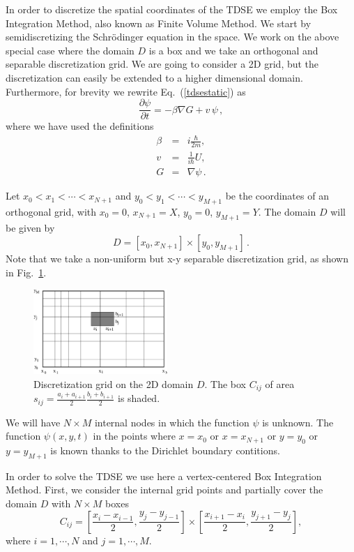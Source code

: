 \documentclass[a4paper,11pt]{article}
\begin{document}
In order to discretize the spatial coordinates of the TDSE we employ
the Box Integration Method, also known as Finite Volume Method.
We start by semidiscretizing the Schr\"{o}dinger equation in the space.
We work on the above special case where the domain $D$ is a box and we take
an orthogonal and separable discretization grid.
We are going to consider a 2D grid, but the discretization can easily be
extended to a higher dimensional domain.
Furthermore, for brevity we rewrite Eq.~(\ref{tdsestatic}) as
\begin{equation} \label{tdsenoconst}
\frac{\partial \psi}{\partial t} = -\beta \nabla G + v \, \psi \, ,
\end{equation}
where we have used the definitions
\begin{eqnarray}
\beta &=& i \frac{\hbar}{2m} , \\
v &=& \frac{1}{i \hbar} U , \\
G &=& \nabla \psi \, .
\end{eqnarray}

Let $ x_0 < x_1 < \cdots < x_{N+1} $ and $ y_0 < y_1 < \cdots < y_{M+1} $ be the coordinates of an
orthogonal grid, with $x_0=0$, $x_{N+1}=X$, $y_0=0$, $y_{M+1}=Y$.
The domain $D$ will be given by
\begin{equation}
D = [x_0, x_{N+1}] \times [y_0, y_{M+1}] \, .
\end{equation}
Note that we take a non-uniform but x-y separable discretization grid, as shown in Fig.~\ref{fig:bimgrid}. 

\begin{figure}
\centerline{\includegraphics[width=2in] {bmgrid.eps} }
\caption{Discretization grid on the 2D domain $D$.  The box $C_{ij}$ of area
$s_{ij}=\frac{a_i+a_{i+1}}{2} \frac{b_i+b_{i+1}}{2}$ is shaded.}
\label{fig:bimgrid}
\end{figure}

We will have $N \times M$ internal nodes in which the function $\psi$ is unknown.
The function $\psi(x, y, t)$ in the points where $x = x_0$ or $x = x_{N+1}$ or $y = y_0$ or $y = y_{M+1}$
is known thanks to the Dirichlet boundary contitions.

In order to solve the TDSE we use here a vertex-centered Box Integration Method.
First, we consider the internal grid points and partially cover the domain $D$
with $N \times M$ boxes 
\begin{equation}
C_{ij} = [\frac{x_i - x_{i-1}}{2}, \frac{y_j - y_{j-1}}{2}] \times
                [\frac{x_{i+1} - x_i}{2}, \frac{y_{j+1} - y_j}{2}] ,
\end{equation}
where $i = 1, \cdots, N$ and $j = 1, \cdots, M$.
\end{document}
